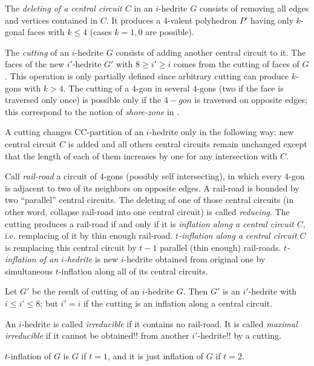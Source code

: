 \documentclass[12pt]{article}
\begin{document}
The {\em deleting of a central circuit $C$} in an $i$-hedrite $G$ consists 
of removing all edges and vertices contained in $C$. It produces a 
$4$-valent polyhedron $P'$ having only $k$-gonal faces 
with $k \leq 4$ (cases $k=1,0$ are possible).


The {\em cutting} of an $i$-hedrite $G$ consists of adding another central 
circuit to it. The faces of the new $i'$-hedrite $G'$ with $8\geq i'\geq i$ 
comes from the cutting of faces of $G$. This operation is only partially
defined since arbitrary cutting can produce $k$-gons with $k>4$. The 
cutting of a $4$-gon in several $4$-gons (two if the face
is traversed only once) is possible only if the $4-gon$ is traversed 
on opposite edges; this correspond to the notion of {\it shore-zone} 
in \cite{DSt}.


A cutting changes CC-partition of an $i$-hedrite only in the following 
way: new central circuit $C$ is added and all others central circuits 
remain unchanged except that the length of each of them increases by one 
for any intersection with $C$. 


Call {\em rail-road} a circuit of $4$-gons (possibly self intersecting), 
in which every $4$-gon is adjacent to two of its neighbors on opposite
edges. A rail-road is bounded by two ``parallel'' central circuits.
The deleting of  one of those central circuits (in other word, collapse 
rail-road into one central circuit) is called {\em reducing}.
The cutting produces a rail-road if and only if it is {\em inflation 
along a central circuit $C$}, i.e. remplacing of it by thin enough 
rail-road. {\em $t$-inflation along a central circuit $C$} is remplacing
this central circuit by $t-1$ parallel (thin enough) rail-roads.
{\em $t$-inflation of an $i$-hedrite} is new $i$-hedrite
obtained from original one by simultaneous $t$-inflation along all
of its central circuits. 



Let $G'$ be the result of cutting of an $i$-hedrite $G$. Then $G'$ is an 
$i'$-hedrite with $i\leq i'\leq 8$; but $i'=i$ if the cutting is an 
inflation along a central circuit.


An $i$-hedrite is called {\em irreducible} if it contains no 
rail-road. It is called {\em maximal irreducible} if it cannot be
obtained!! from another $i'$-hedrite!! by a cutting.

$t$-inflation of $G$ is $G$ if $t=1$, and it is just inflation of $G$ 
if $t=2$.
\end{document}
